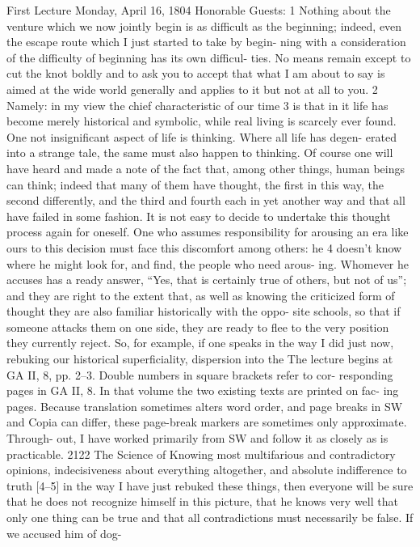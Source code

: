 First Lecture
Monday, April 16, 1804
Honorable Guests: 1
Nothing about the venture which we now jointly begin is as difficult as the
beginning; indeed, even the escape route which I just started to take by begin-
ning with a consideration of the difficulty of beginning has its own difficul-
ties. No means remain except to cut the knot boldly and to ask you to accept
that what I am about to say is aimed at the wide world generally and applies
to it but not at all to you. 2
Namely: in my view the chief characteristic of our time 3 is that in it life
has become merely historical and symbolic, while real living is scarcely ever
found. One not insignificant aspect of life is thinking. Where all life has degen-
erated into a strange tale, the same must also happen to thinking. Of course one
will have heard and made a note of the fact that, among other things, human
beings can think; indeed that many of them have thought, the first in this way,
the second differently, and the third and fourth each in yet another way and
that all have failed in some fashion. It is not easy to decide to undertake this
thought process again for oneself. One who assumes responsibility for arousing
an era like ours to this decision must face this discomfort among others: he 4
doesn’t know where he might look for, and find, the people who need arous-
ing. Whomever he accuses has a ready answer, “Yes, that is certainly true of
others, but not of us”; and they are right to the extent that, as well as knowing
the criticized form of thought they are also familiar historically with the oppo-
site schools, so that if someone attacks them on one side, they are ready to flee
to the very position they currently reject. So, for example, if one speaks in the
way I did just now, rebuking our historical superficiality, dispersion into the
The lecture begins at GA II, 8, pp. 2–3. Double numbers in square brackets refer to cor-
responding pages in GA II, 8. In that volume the two existing texts are printed on fac-
ing pages. Because translation sometimes alters word order, and page breaks in SW and
Copia can differ, these page-break markers are sometimes only approximate. Through-
out, I have worked primarily from SW and follow it as closely as is practicable.
2122
The Science of Knowing
most multifarious and contradictory opinions, indecisiveness about everything
altogether, and absolute indifference to truth [4–5] in the way I have just
rebuked these things, then everyone will be sure that he does not recognize
himself in this picture, that he knows very well that only one thing can be true
and that all contradictions must necessarily be false. If we accused him of dog-
